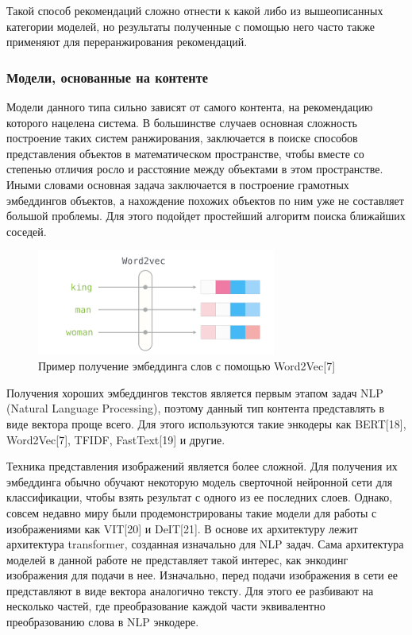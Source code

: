 \documentclass[bachelor, och, coursework]{SCWorks}
\begin{document}
Такой способ рекомендаций сложно отнести к какой либо из вышеописанных категории моделей, но результаты полученные
с помощью него часто также применяют для переранжирования рекомендаций.
\subsubsection{Модели, основанные на контенте}
Модели данного типа сильно зависят от самого контента, на рекомендацию которого нацелена система. В большинстве случаев
основная сложность построение таких систем ранжирования, заключается в поиске способов представления объектов в математическом
пространстве, чтобы вместе со степенью отличия росло и расстояние между объектами в этом пространстве. Иными словами
основная задача заключается в построение грамотных эмбеддингов объектов, а нахождение похожих объектов по ним уже не
составляет большой проблемы. Для этого подойдет простейший алгоритм поиска ближайших соседей.

\begin{figure}[H]
    \centering
    \includegraphics[width=0.7\textwidth]{pic/5}
    \caption{Пример получение эмбеддинга слов с помощью Word2Vec[7]}
    \label{fig:img1}
\end{figure}

Получения хороших эмбеддингов текстов является первым этапом задач NLP (Natural Language Processing), поэтому данный тип
контента представлять в виде вектора проще всего. Для этого используются такие энкодеры как BERT[18], Word2Vec[7], TFIDF, FastText[19] и другие.

Техника представления изображений является более сложной. Для получения их эмбеддинга обычно обучают некоторую модель сверточной нейронной сети для
классификации, чтобы взять результат с одного из ее последних слоев. Однако, совсем недавно миру были продемонстрированы такие модели
для работы с изображениями как VIT[20] и DeIT[21]. В основе их архитектуру лежит архитектура transformer, созданная изначально для NLP задач.
Сама архитектура моделей в данной работе не представляет такой интерес, как энкодинг изображения для подачи в нее. Изначально,
перед подачи изображения в сети ее представляют в виде вектора аналогично тексту. Для этого ее разбивают на несколько
частей, где преобразование каждой части эквивалентно преобразованию слова в NLP энкодере.
\end{document}
